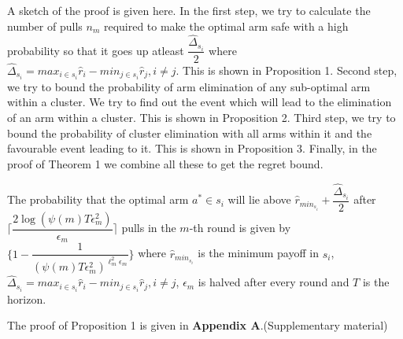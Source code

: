 \begin{remark}
A sketch of the proof is given here. In the first step, we try to calculate the number of pulls $n_{m}$ required to make the optimal arm  safe with a high probability so that it goes up atleast $\dfrac{\hat{\Delta}_{s_{i}}}{2}$ where $\hat{\Delta}_{s_{i}}=max_{i\in s_{i}}\hat{r}_{i}-min_{j\in s_{i}}\hat{r}_{j},i\neq j$. This is shown in Proposition 1. Second step, we try to bound the probability of arm elimination of any sub-optimal arm within a cluster. We try to find out the event which will lead to the elimination of an arm within a cluster. This is shown in Proposition 2. Third step, we try to bound the probability of cluster elimination with all arms within it and the favourable event leading to it. This is shown in Proposition 3. Finally, in the proof of Theorem 1 we combine all these to get the regret bound.  
\end{remark}
	
\begin{proposition}
The probability that the optimal arm $a^{*}\in s_{i}$ will lie above $\hat{r}_{min_{s_{i}}}+ \dfrac{\hat{\Delta}_{s_{i}}}{2}$ after $\bigg\lceil\dfrac{2\log (\psi(m)T\epsilon_{m}^{2})}{\epsilon_{m}}\bigg\rceil$ pulls in the $m$-th round is given by $\bigg\lbrace 1- \dfrac{1}{(\psi(m)T\epsilon_{m}^{2})^{\ell_{m}^{2}\epsilon_{m}}} \bigg\rbrace$ where $\hat{r}_{min_{s_{i}}}$ is the minimum payoff in $s_{i}$, $\hat{\Delta}_{s_{i}}=max_{i\in s_{i}}\hat{r}_{i}-min_{j\in s_{i}}\hat{r}_{j}, i\neq j$, $\epsilon_{m}$ is halved after every round and $T$ is the horizon. 
\end{proposition}


	The proof of Proposition 1 is given in \textbf{Appendix A}.(Supplementary material)

